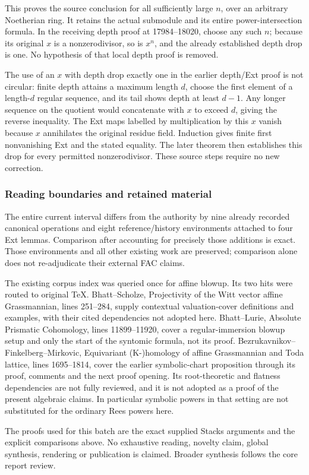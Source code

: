 This proves the source conclusion for all sufficiently large \(n\), over an arbitrary Noetherian ring. It retains the actual submodule and its entire power-intersection formula. In the receiving depth proof at 17984--18020, choose any such \(n\); because its original \(x\) is a nonzerodivisor, so is \(x^n\), and the already established depth drop is one. No hypothesis of that local depth proof is removed.

The use of an \(x\) with depth drop exactly one in the earlier depth/Ext proof is not circular: finite depth attains a maximum length \(d\), choose the first element of a length-\(d\) regular sequence, and its tail shows depth at least \(d-1\). Any longer sequence on the quotient would concatenate with \(x\) to exceed \(d\), giving the reverse inequality. The Ext maps labelled by multiplication by this \(x\) vanish because \(x\) annihilates the original residue field. Induction gives finite first nonvanishing Ext and the stated equality. The later theorem then establishes this drop for every permitted nonzerodivisor. These source steps require no new correction.

\subsubsection{Reading boundaries and retained material}\label{reading-boundaries-and-retained-material}

The entire current interval differs from the authority by nine already recorded canonical operations and eight reference/history environments attached to four Ext lemmas. Comparison after accounting for precisely those additions is exact. Those environments and all other existing work are preserved; comparison alone does not re-adjudicate their external FAC claims.

The existing corpus index was queried once for affine blowup. Its two hits were routed to original TeX. Bhatt--Scholze, Projectivity of the Witt vector affine Grassmannian, lines 251--284, supply contextual valuation-cover definitions and examples, with their cited dependencies not adopted here. Bhatt--Lurie, Absolute Prismatic Cohomology, lines 11899--11920, cover a regular-immersion blowup setup and only the start of the syntomic formula, not its proof. Bezrukavnikov--Finkelberg--Mirkovic, Equivariant (K-)homology of affine Grassmannian and Toda lattice, lines 1695--1814, cover the earlier symbolic-chart proposition through its proof, comments and the next proof opening. Its root-theoretic and flatness dependencies are not fully reviewed, and it is not adopted as a proof of the present algebraic claims. In particular symbolic powers in that setting are not substituted for the ordinary Rees powers here.

The proofs used for this batch are the exact supplied Stacks arguments and the explicit comparisons above. No exhaustive reading, novelty claim, global synthesis, rendering or publication is claimed. Broader synthesis follows the core report review.

